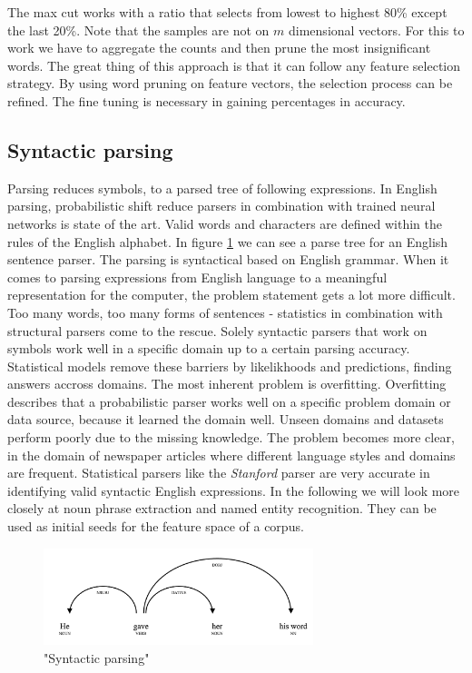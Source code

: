     The max cut works with a ratio that selects from lowest to highest 80\% except the last 20\%. Note that the samples are not on $m$ dimensional vectors. For this to work we have to aggregate the counts and then prune the most insignificant words. The great thing of this approach is that it can follow any feature selection strategy. By using word pruning on feature vectors, the selection process can be refined. The fine tuning is necessary in gaining percentages in accuracy.

  \subsection{Syntactic parsing}
  \label{sec:syntactic_parsing}

  Parsing reduces symbols, to a parsed tree of following expressions. In English parsing, probabilistic shift reduce parsers in combination with trained neural networks is state of the art. \cite[Stanford, Spacy]{Nothing} Valid words and characters are defined within the rules of the English alphabet. In figure \ref{syntactic_parsing} we can see a parse tree for an English sentence parser. The parsing is syntactical based on English grammar. When it comes to parsing expressions from English language to a meaningful representation for the computer, the problem statement gets a lot more difficult. Too many words, too many forms of sentences - statistics in combination with structural parsers come to the rescue. Solely syntactic parsers that work on symbols work well in a specific domain up to a certain parsing accuracy. Statistical models remove these barriers by likelikhoods and predictions, finding answers accross domains. The most inherent problem is overfitting. Overfitting describes that a probabilistic parser works well on a specific problem domain or data source, because it learned the domain well. Unseen domains and datasets perform poorly due to the missing knowledge. The problem becomes more clear, in the domain of newspaper articles where different language styles and domains are frequent. Statistical parsers like the \emph{Stanford} parser are very accurate in identifying valid syntactic English expressions. In the following we will look more closely at noun phrase extraction and named entity recognition. They can be used as initial seeds for the feature space of a corpus.

    \begin{figure}[h!]
      \centering
        \includegraphics[width=0.7\textwidth]{sentence_structure.png}
        \caption{"Syntactic parsing"}
        \label{syntactic_parsing}
    \end{figure} 

